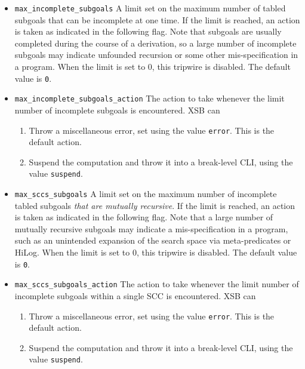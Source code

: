 \begin{description}
\begin{itemize}
\item {\tt max\_incomplete\_subgoals} A limit set on the maximum
  number of tabled subgoals that can be incomplete at one time.  If
  the limit is reached, an action is taken as indicated in the
  following flag.  Note that subgoals are usually completed during the
  course of a derivation, so a large number of incomplete subgoals may
  indicate unfounded recursion or some other mis-specification in a
  program.  When the limit is set to 0, this tripwire is
  disabled.  The default value is {\tt 0}.

\item {\tt max\_incomplete\_subgoals\_action} The action to take
  whenever the limit number of incomplete subgoals is encountered.
  XSB can
\begin{enumerate}
\item Throw a miscellaneous error, set using the value {\tt error}.
  This is the default action.
%
\item Suspend the computation and throw it into a break-level CLI,
  using the value {\tt suspend}.
%
\end{enumerate}

\item {\tt max\_sccs\_subgoals} A limit set on the maximum number of
  incomplete tabled subgoals {\em that are mutually recursive}.  If
  the limit is reached, an action is taken as indicated in the
  following flag.  Note that a large number of mutually recursive
  subgoals may indicate a mis-specification in a program, such as an
  unintended expansion of the search space via meta-predicates or
  HiLog.  When the limit is set to 0, this tripwire is disabled.
  The default value is {\tt 0}.

\item {\tt max\_sccs\_subgoals\_action} The action to take whenever
  the limit number of incomplete subgoals within a single SCC is
  encountered.  XSB can
\begin{enumerate}
\item Throw a miscellaneous error, set using the value {\tt error}.
  This is the default action.
%
\item Suspend the computation and throw it into a break-level CLI,
  using the value {\tt suspend}.
%
\end{enumerate}



\end{itemize}
\end{description}
